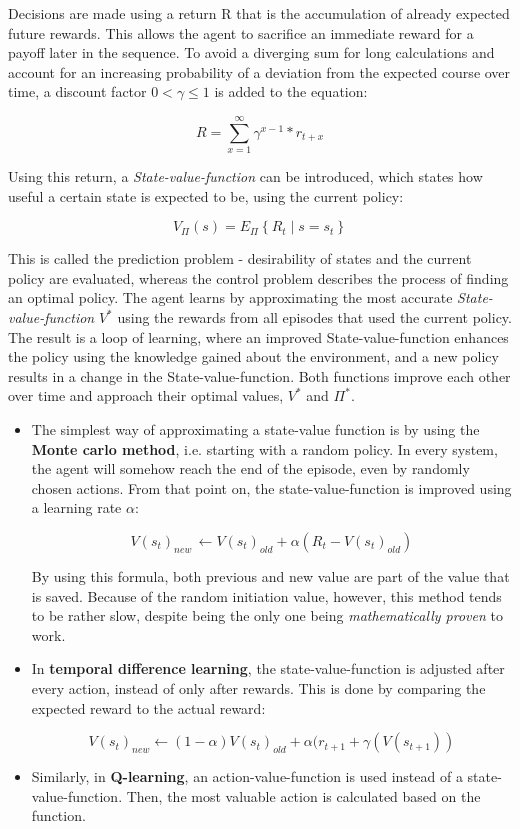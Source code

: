 \documentclass[12pt,a4]{article}
\begin{document}
Decisions are made using a return R that is the accumulation of already expected future rewards. This allows the agent to sacrifice an immediate reward for a payoff later in the sequence. To avoid a diverging sum for long calculations and account for an increasing probability of a deviation from the expected course over time, a discount factor \(0< \gamma \leq 1\) is added to the equation:

\[R =\sum_{x=1}^{\infty} \gamma^{x-1}*r_{t+x}\]

Using this return, a \emph{State-value-function} can be introduced, which states how useful a certain state is expected to be, using the current policy:

\[V_{\Pi }(s) = E_{\Pi}\left \{ R_{t}\mid s\! =\! s_{t} \right \}\]

This is called the prediction problem - desirability of states and the current policy are evaluated, whereas the control problem describes the process of finding an optimal policy. The agent learns by approximating the most accurate \emph{State-value-function} \(V^\ast\) using the rewards from all episodes that used the current policy. The result is a loop of learning, where an improved State-value-function enhances the policy using the knowledge gained about the environment, and a new policy results in a change in the State-value-function. Both functions improve each other over time and approach their optimal values, \(V^\ast\) and \(\Pi^\ast\).

\begin{itemize}
    \item The simplest way of approximating a state-value function is by using the \textbf{Monte carlo method}, i.e. starting with a random policy. In every system, the agent will somehow reach the end of the episode, even by randomly chosen actions. From that point on, the state-value-function is improved using a learning rate \(\alpha\):
    
    \[V(s_{t})_{new} \, \leftarrow V(s_{t})_{old}+\alpha(R_{t}-V(s_{t})_{old})\]
    
    By using this formula, both previous and new value are part of the value that is saved. Because of the random initiation value, however, this method tends to be rather slow, despite being the only one being \emph{mathematically proven} to work.
    
    \item In \textbf{temporal difference learning}, the state-value-function is adjusted after every action, instead of only after rewards. This is done  by comparing the expected reward to the actual reward: \citep{wikiTD}
    
    \[V(s_{t})_{new} \leftarrow (1-\alpha)V(s_{t})_{old}+ \alpha(r_{t+1}+\gamma(V(s_{t+1}))\]
    
    \item Similarly, in \textbf{Q-learning}, an action-value-function is used instead of a state-value-function. Then, the most valuable action is calculated based on the function.
\end{itemize}
\end{document}
